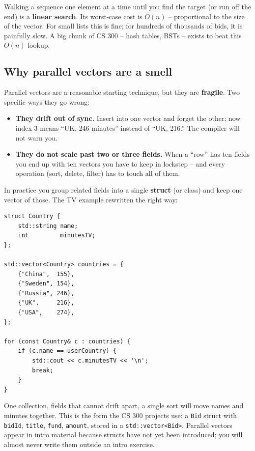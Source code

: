 \documentclass[11pt]{article}
\begin{document}
\begin{defnbox}
Walking a sequence one element at a time until you find the target
(or run off the end) is a \textbf{linear search}. Its worst-case cost
is $O(n)$ -- proportional to the size of the vector. For small
lists this is fine; for hundreds of thousands of bids, it is
painfully slow. A big chunk of CS 300 -- hash tables, BSTs -- exists
to beat this $O(n)$ lookup.
\end{defnbox}

\subsection{Why parallel vectors are a smell}

Parallel vectors are a reasonable starting technique, but they are
\textbf{fragile}. Two specific ways they go wrong:

\begin{itemize}
    \item \textbf{They drift out of sync.} Insert into one vector and
          forget the other; now index 3 means ``UK, 246 minutes''
          instead of ``UK, 216.'' The compiler will not warn you.
    \item \textbf{They do not scale past two or three fields.} When a
          ``row'' has ten fields you end up with ten vectors you have
          to keep in lockstep -- and every operation (sort, delete,
          filter) has to touch all of them.
\end{itemize}

\begin{warnbox}
In practice you group related fields into a single \textbf{struct}
(or class) and keep one vector of those. The TV example rewritten the
right way:
\begin{lstlisting}
struct Country {
    std::string name;
    int         minutesTV;
};

std::vector<Country> countries = {
    {"China",  155},
    {"Sweden", 154},
    {"Russia", 246},
    {"UK",     216},
    {"USA",    274},
};

for (const Country& c : countries) {
    if (c.name == userCountry) {
        std::cout << c.minutesTV << '\n';
        break;
    }
}
\end{lstlisting}
One collection, fields that cannot drift apart, a single sort will
move names and minutes together. This is the form the CS 300 projects
use: a \texttt{Bid} struct with \texttt{bidId}, \texttt{title},
\texttt{fund}, \texttt{amount}, stored in a \texttt{std::vector<Bid>}.
Parallel vectors appear in intro material because structs have not yet
been introduced; you will almost never write them outside an intro
exercise.
\end{warnbox}
\end{document}
